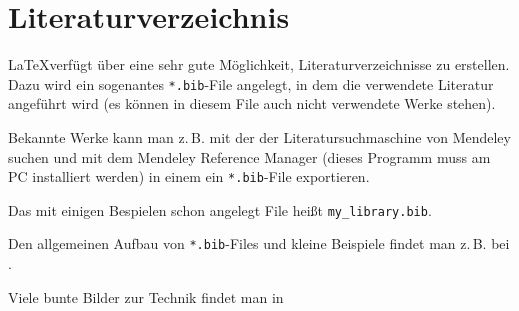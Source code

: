 		\pagebreak
		\section{Literaturverzeichnis}
			\LaTeX verfügt über eine sehr gute Möglichkeit, Literaturverzeichnisse zu erstellen. Dazu wird ein sogenantes \verb|*.bib|-File angelegt, in dem die verwendete Literatur angeführt wird (es können in diesem File auch nicht verwendete Werke stehen).

			Bekannte Werke kann man z.\,B. mit der der Literatursuchmaschine von Mendeley suchen und mit dem Mendeley Reference Manager (dieses Programm muss am PC installiert werden) in einem  ein \verb|*.bib|-File exportieren.

			Das mit einigen Bespielen schon angelegt File heißt \verb|my_library.bib|.

			Den allgemeinen Aufbau von \verb|*.bib|-Files und kleine Beispiele findet man z.\,B. bei  \cite{wikibook:biber}.

			Viele bunte Bilder zur Technik findet man in \cite{fk_metall}






